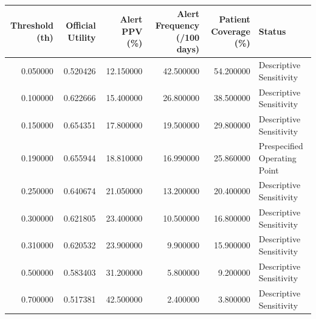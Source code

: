 \begin{tabular}{rrrrrl}
\toprule
Threshold (th) & Official Utility & Alert PPV (\%) & Alert Frequency (/100 days) & Patient Coverage (\%) & Status \\
\midrule
0.050000 & 0.520426 & 12.150000 & 42.500000 & 54.200000 & Descriptive Sensitivity \\
0.100000 & 0.622666 & 15.400000 & 26.800000 & 38.500000 & Descriptive Sensitivity \\
0.150000 & 0.654351 & 17.800000 & 19.500000 & 29.800000 & Descriptive Sensitivity \\
0.190000 & 0.655944 & 18.810000 & 16.990000 & 25.860000 & Prespecified Operating Point \\
0.250000 & 0.640674 & 21.050000 & 13.200000 & 20.400000 & Descriptive Sensitivity \\
0.300000 & 0.621805 & 23.400000 & 10.500000 & 16.800000 & Descriptive Sensitivity \\
0.310000 & 0.620532 & 23.900000 & 9.900000 & 15.900000 & Descriptive Sensitivity \\
0.500000 & 0.583403 & 31.200000 & 5.800000 & 9.200000 & Descriptive Sensitivity \\
0.700000 & 0.517381 & 42.500000 & 2.400000 & 3.800000 & Descriptive Sensitivity \\
\bottomrule
\end{tabular}
